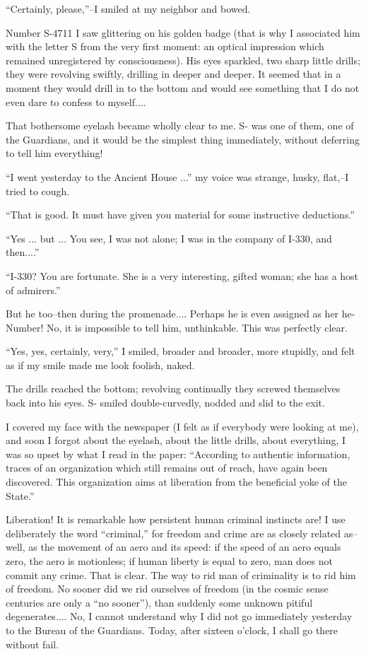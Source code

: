 \documentclass[11pt,openany]{book}
\begin{document}
``Certainly, please,''--I smiled at my neighbor and bowed.

Number S-4711 I saw glittering on his golden badge (that is why I associated him with the letter S from the very first moment: an optical impression which remained unregistered by consciousness). His eyes sparkled, two sharp little drills; they were revolving swiftly, drilling in deeper and deeper. It seemed that in a moment they would drill in to the bottom and would see something that I do not even dare to confess to myself....

That bothersome eyelash became wholly clear to me. S- was one of them, one of the Guardians, and it would be the simplest thing immediately, without deferring to tell him everything!

``I went yesterday to the Ancient House ...'' my voice was strange, husky, flat,--I tried to cough.

``That is good. It must have given you material for some instructive deductions.''

``Yes ... but ... You see, I was not alone; I was in the company of I-330, and then....''

``I-330? You are fortunate. She is a very interesting, gifted woman; she has a host of admirers.''

But he too--then during the promenade.... Perhaps he is even assigned as her he-Number! No, it is impossible to tell him, unthinkable. This was perfectly clear.

``Yes, yes, certainly, very,'' I smiled, broader and broader, more stupidly, and felt as if my smile made me look foolish, naked.

The drills reached the bottom; revolving continually they screwed themselves back into his eyes. S- smiled double-curvedly, nodded and slid to the exit.

I covered my face with the newspaper (I felt as if everybody were looking at me), and soon I forgot about the eyelash, about the little drills, about everything, I was so upset by what I read in the paper: ``According to authentic information, traces of an organization which still remains out of reach, have again been discovered. This organization aims at liberation from the beneficial yoke of the State.''

Liberation! It is remarkable how persistent human criminal instincts are! I use deliberately the word ``criminal,'' for freedom and crime are as closely related as--well, as the movement of an aero and its speed: if the speed of an aero equals zero, the aero is motionless; if human liberty is equal to zero, man does not commit any crime. That is clear. The way to rid man of criminality is to rid him of freedom. No sooner did we rid ourselves of freedom (in the cosmic sense centuries are only a ``no sooner''), than suddenly some unknown pitiful degenerates.... No, I cannot understand why I did not go immediately yesterday to the Bureau of the Guardians. Today, after sixteen o'clock, I shall go there without fail.
\end{document}
